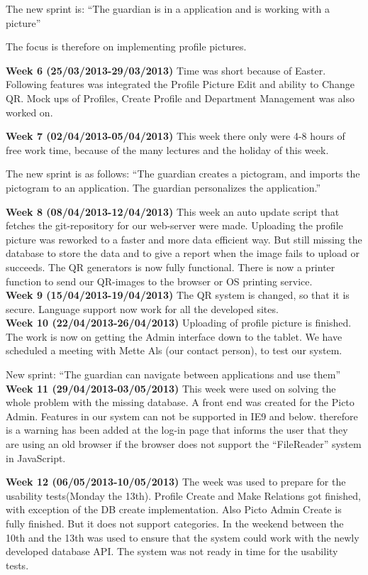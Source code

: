 The new sprint is:
``The guardian is in a application and is working with a picture''

The focus is therefore on implementing profile pictures. 

\textbf{Week 6 (25/03/2013-29/03/2013)}
Time was short because of Easter. 
Following features was integrated the Profile Picture Edit and ability to Change QR.
Mock ups of Profiles, Create Profile and Department Management was also worked on.    

\textbf{Week 7 (02/04/2013-05/04/2013)}
This week there only were 4-8 hours of free work time, because of the many lectures and the holiday of this week.

The new sprint is as follows: 
``The guardian creates a pictogram, and imports the pictogram to an application. The guardian personalizes the application.''

\textbf{Week 8 (08/04/2013-12/04/2013)}
This week an auto update script that fetches the git-repository for our web-server were made.
Uploading the profile picture was reworked to a faster and more data efficient way. 
But still missing the database to store the data and to give a report when the image fails to upload or succeeds.
The QR generators is now fully functional. 
There is now a printer function to send our QR-images to the browser or OS printing service.
\\
\textbf{Week 9 (15/04/2013-19/04/2013)}
The QR system is changed, so that it is secure. 
Language support now work for all the developed sites. \\

\textbf{Week 10 (22/04/2013-26/04/2013)}
Uploading of profile picture is finished.
The work is now on getting the Admin interface down to the tablet.
We have scheduled a meeting with Mette Als (our contact person), to test our system. 

New sprint: 
``The guardian can navigate between applications and use them''
\\
\textbf{Week 11 (29/04/2013-03/05/2013)}
This week were used on solving the whole problem with the missing database.
A front end was created for the Picto Admin. Features  in our system can not be supported in IE9 and below. therefore is a warning has been added at the log-in page that informs the user that they are using an old browser if the browser does not support the ``FileReader'' system in JavaScript.

\textbf{Week 12 (06/05/2013-10/05/2013)}
The week was used to prepare for the usability tests(Monday the 13th).
Profile Create and Make Relations got finished, with exception of the DB create implementation. 
Also Picto Admin Create is fully finished. But it does not support categories. 
In the weekend between the 10th and the 13th was used to ensure that the system could work with the newly developed database API. The system was not ready in time for the usability tests. 

